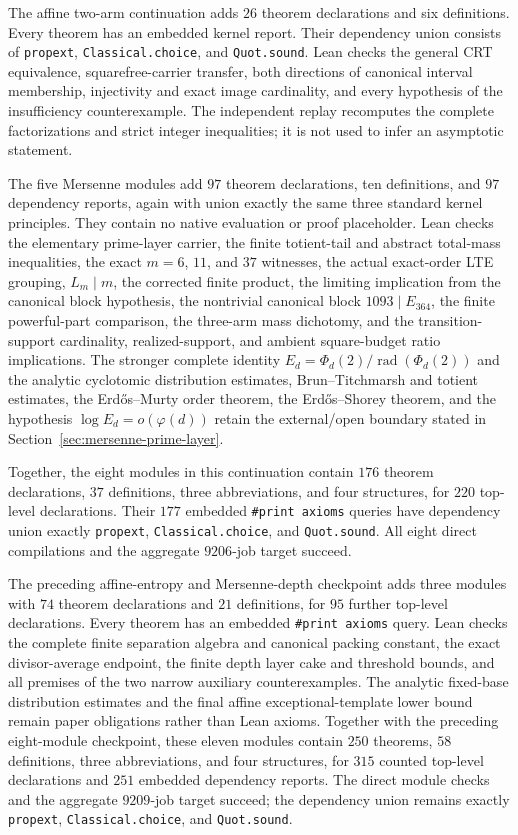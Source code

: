 \documentclass[11pt]{amsart}
\theoremstyle{definition}
\theoremstyle{remark}
\begin{document}
The affine two-arm continuation adds $26$ theorem declarations and six
definitions.  Every theorem has an embedded kernel report.  Their dependency
union consists of \texttt{propext}, \texttt{Classical.choice}, and
\texttt{Quot.sound}.
Lean checks the general CRT equivalence, squarefree-carrier transfer, both
directions of canonical interval membership, injectivity and exact image
cardinality, and every hypothesis of the insufficiency counterexample.  The
independent replay recomputes the complete factorizations and strict integer
inequalities; it is not used to infer an asymptotic statement.

The five Mersenne modules add $97$ theorem declarations, ten definitions,
and $97$ dependency reports, again with union exactly the same three standard
kernel principles.  They contain no native evaluation or proof placeholder.
Lean checks the elementary prime-layer carrier, the finite totient-tail and
abstract total-mass inequalities, the exact $m=6$, $11$, and $37$ witnesses,
the actual exact-order LTE grouping, $L_m\mid m$, the corrected finite product,
the limiting implication from the canonical block hypothesis, the
nontrivial canonical block $1093\mid E_{364}$, the finite powerful-part
comparison, the three-arm mass dichotomy, and the transition-support
cardinality, realized-support, and ambient square-budget ratio implications.
 The stronger complete identity
$E_d=\Phi_d(2)/\operatorname{rad}(\Phi_d(2))$ and the analytic
cyclotomic distribution estimates,
Brun--Titchmarsh and totient estimates, the Erd\H{o}s--Murty order theorem,
the Erd\H{o}s--Shorey theorem, and the hypothesis
$\log E_d=o(\varphi(d))$ retain the external/open boundary stated in
Section~\ref{sec:mersenne-prime-layer}.

Together, the eight modules in this continuation contain $176$ theorem
declarations, $37$ definitions, three abbreviations, and four structures,
for $220$ top-level declarations.  Their $177$ embedded
\texttt{\#print axioms} queries have dependency union exactly
\texttt{propext}, \texttt{Classical.choice}, and \texttt{Quot.sound}.  All
eight direct compilations and the aggregate $9206$-job target succeed.

The preceding affine-entropy and Mersenne-depth checkpoint adds three modules
with $74$ theorem declarations and $21$ definitions, for $95$ further
top-level declarations.  Every theorem has an embedded
\texttt{\#print axioms} query.  Lean checks the complete finite separation
algebra and canonical packing constant, the exact divisor-average endpoint,
the finite depth layer cake and threshold bounds, and all premises of the two
narrow auxiliary counterexamples.  The analytic fixed-base distribution
estimates and the final affine exceptional-template lower bound remain paper
obligations rather than Lean axioms.
Together with the preceding eight-module checkpoint, these eleven modules
contain $250$ theorems, $58$ definitions, three abbreviations, and four
structures, for $315$ counted top-level declarations and $251$ embedded
dependency reports.  The direct module checks and the aggregate $9209$-job
target succeed; the dependency union remains exactly \texttt{propext},
\texttt{Classical.choice}, and \texttt{Quot.sound}.
\end{document}
